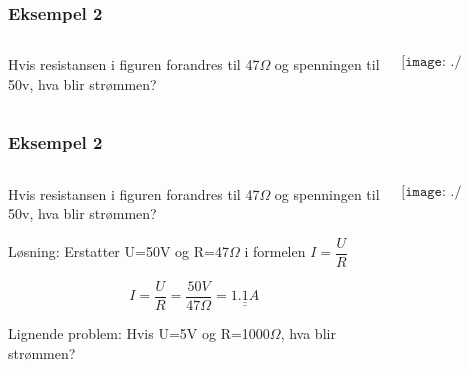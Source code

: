 \documentclass[aspectratio=169,xcolor=dvipsnames]{beamer}
\begin{document}
\begin{frame}
	\frametitle{Eksempel 2}

	\begin{columns}
		\begin{column}{0.5\textwidth}
			Hvis resistansen i figuren forandres til 47$\Omega$ og
spenningen til 50v, hva blir strømmen?


		\end{column}

		\begin{column}{0.5\textwidth}
			$$\texttt{[image: ./eksempel1.pdf]}$$
		\end{column}
	\end{columns}
\end{frame}


\begin{frame}
	\frametitle{Eksempel 2}

	\begin{columns}
		\begin{column}{0.5\textwidth}
			Hvis resistansen i figuren forandres til 47$\Omega$ og
spenningen til 50v, hva blir strømmen?

\vskip 0.5cm
Løsning: Erstatter U=50V og R=47$\Omega$ i formelen $I=\dfrac{U}{R}$

\[
I=\dfrac{U}{R}=\dfrac{50V}{47\Omega}=\underline{\underline{1.1A}}
\]

Lignende problem: Hvis U=5V og R=1000$\Omega$, hva blir strømmen?

		\end{column}

		\begin{column}{0.5\textwidth}
			$$\texttt{[image: ./eksempel1.pdf]}$$
		\end{column}
	\end{columns}
\end{frame}
\end{document}
